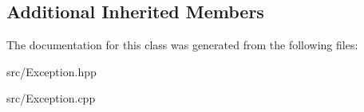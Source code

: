 \subsection*{Additional Inherited Members}


The documentation for this class was generated from the following files\+:\begin{DoxyCompactItemize}
\item 
src/Exception.\+hpp\item 
src/Exception.\+cpp\end{DoxyCompactItemize}
